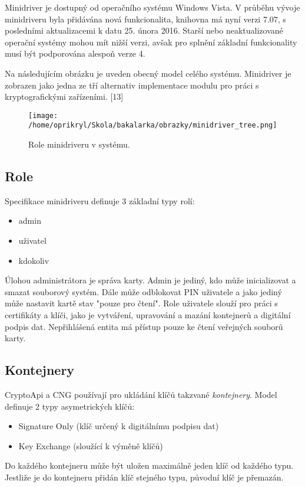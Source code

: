 \documentclass[]{fithesis3}
\begin{document}
	Minidriver je dostupný od operačního systému Windows Vista. V průběhu vývoje minidriveru byla		přidávána nová funkcionalita, knihovna má nyní verzi 7.07, s posledními aktualizacemi k datu 		25. února 2016. Starší nebo neaktualizované operační systémy mohou mít nižší verzi, avšak 		pro splnění základní funkcionality musí být podporována alespoň verze 4. \newline

	Na následujícím obrázku je uveden obecný model celého systému. Minidriver je zobrazen jako 		jedna ze tří alternativ implementace modulu pro práci s kryptografickými zařízeními.  [13]

		\begin{figure}[!ht]
  			\begin{minipage}{1.00\textwidth}
    				\texttt{[image: /home/oprikryl/Skola/bakalarka/obrazky/minidriver\_tree.png]}
  			\end{minipage}
 			\caption{Role minidriveru v systému.}
  			\label{fig:Role minidriveru v systému.}
		\end{figure}	

		\subsection{Role}
		
		Specifikace minidriveru definuje 3 základní typy rolí:
		\begin{itemize}
			\item admin
			\item uživatel
			\item kdokoliv
		\end{itemize}
		Úlohou administrátora je správa karty. Admin je jediný, kdo může inicializovat a smazat 				souborový systém. Dále může odblokovat PIN uživatele a jako jediný může nastavit 				kartě stav "pouze pro čtení". Role uživatele slouží pro práci s certifikáty a klíči, jako je 				vytváření, upravování a mazání kontejnerů a digitální podpis dat. Nepřihlášená entita má 			přístup pouze ke čtení veřejných souborů karty.

		\subsection{Kontejnery}
		CryptoApi a CNG používají pro ukládání klíčů takzvané \textit{kontejnery}. Model definuje 			2 typy asymetrických klíčů:
		\begin{itemize}
			\item Signature Only (klíč určený k digitálnímu podpisu dat)
			\item  Key Exchange (sloužící k výměně klíčů)
		\end{itemize}		
		Do každého kontejneru může být uložen maximálně jeden klíč od každého typu. Jestliže je 			do kontejneru přidán klíč stejného typu, původní klíč je přemazán.
\end{document}
